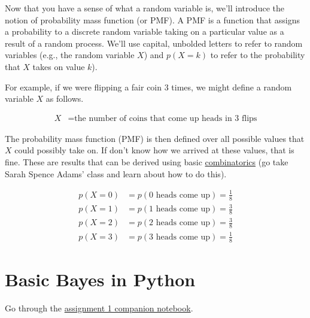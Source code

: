 \documentclass[assignment01_Solutions]{subfiles}
\begin{document}
Now that you have a sense of what a random variable is, we'll introduce the notion of probability mass function (or PMF).  A PMF is a function that assigns a probability to a discrete random variable taking on a particular value as a result of a random process.  We'll use capital, unbolded letters to refer to random variables (e.g., the random variable $X$) and $p(X = k)$ to refer to the probability that $X$ takes on value $k$).

For example, if we were flipping a fair coin 3 times, we might define a random variable $X$ as follows.

\begin{align}
X&= \mbox{the number of coins that come up heads in 3 flips}
\end{align}

The probability mass function (PMF) is then defined over all possible values that $X$ could possibly take on.  If don't know how we arrived at these values, that is fine.  These are results that can be derived using basic \href{https://en.wikipedia.org/wiki/Combinatorics}{combinatorics} (go take Sarah Spence Adams' class and learn about how to do this).

\begin{align}
p(X=0) &= p(\mbox{0 heads come up}) = \frac{1}{8} \nonumber \\
p(X=1) &= p(\mbox{1 heads come up}) = \frac{3}{8} \nonumber \\
p(X=2) &= p(\mbox{2 heads come up}) = \frac{3}{8} \nonumber \\
p(X=3) &= p(\mbox{3 heads come up}) = \frac{1}{8} \nonumber 
\end{align}


\section{Basic Bayes in Python}
\begin{externalresources}[(30 minutes)]
Go through the \href{https://colab.research.google.com/github/mlfa19/assignments/blob/master/Module\%202/01/Assignment_1_Companion_Notebook.ipynb}{assignment 1 companion notebook}.
\end{externalresources}
\end{document}
